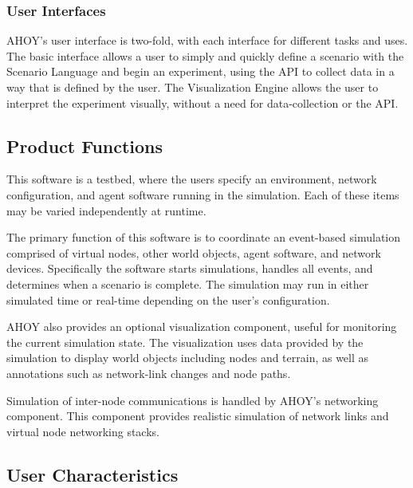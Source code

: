 \documentclass[titlepage]{article}
\begin{document}

\subsubsection{User Interfaces%
  \label{user-interfaces}%
}

AHOY's user interface is two-fold, with each interface for different tasks and uses. The basic interface allows a user to simply and quickly define a scenario with the Scenario Language and begin an experiment, using the API to collect data in a way that is defined by the user. The Visualization Engine allows the user to interpret the experiment visually, without a need for data-collection or the API.


\subsection{Product Functions%
  \label{product-functions}%
}

This software is a testbed, where the users specify an environment, network configuration, and agent software running in
the simulation. Each of these items may be varied independently at runtime.

The primary function of this software is to coordinate an event-based simulation comprised of virtual nodes, other world objects,
agent software, and network devices.  Specifically the software starts simulations, handles all events, and determines
when a scenario is complete.  The simulation may run in either simulated time or real-time depending on the user's
configuration.

AHOY also provides an optional visualization component, useful for monitoring the current simulation state.  The
visualization uses data provided by the simulation to display world objects including nodes and terrain, as well as
annotations such as network-link changes and node paths.

Simulation of inter-node communications is handled by AHOY's networking component.  This component provides realistic
simulation of network links and virtual node networking stacks.



\subsection{User Characteristics%
  \label{user-characteristics}%
}
\end{document}
